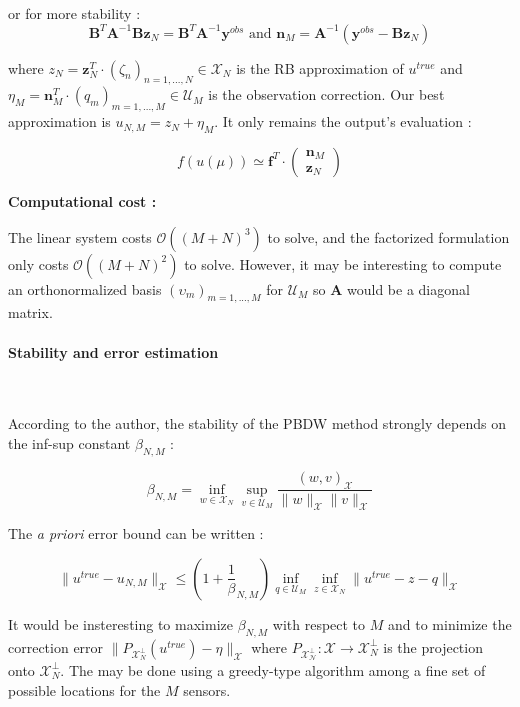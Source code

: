 \documentclass{article}
\begin{document}
or for more stability : $$\mathbf B^T\mathbf A^{-1}\mathbf B\mathbf z_N=\mathbf B^T\mathbf A^{-1}\mathbf y^{obs}\text{ and }\mathbf n_M=\mathbf A^{-1}(\mathbf y^{obs}-\mathbf B\mathbf z_N)$$


where $z_N=\mathbf z_N^T\cdot (\zeta_n)_{n=1,...,N}\in\mathcal X_N$ is the RB approximation of $u^{true}$ and $\eta_M=\mathbf n_M^T\cdot(q_m)_{m=1,...,M}\in\mathcal U_M$ is the observation correction. Our best approximation is  $u_{N,M}=z_N+\eta_M$. It only remains the output's evaluation :

$$f(u(\mu))\simeq\mathbf f^T\cdot\left(\begin{matrix}\mathbf n_M\\\mathbf z_N\end{matrix}\right)$$



\textbf{Computational cost :}

The linear system costs $\mathcal O((M+N)^3)$ to solve, and the factorized formulation only costs $\mathcal O((M+N)^2)$ to solve. However, it may be interesting to compute an orthonormalized basis $(\upsilon_m)_{m=1,...,M}$ for $\mathcal U_M$ so $\mathbf A$ would be a diagonal matrix.





\paragraph{Stability and error estimation}~


According to the author, the stability of the PBDW method strongly depends on the inf-sup constant $\beta_{N,M}$ :

$$\beta_{N,M} = \inf_{w\in\mathcal X_N}\sup_{v\in\mathcal U_M}\frac{(w,v)_\mathcal X}{\|w\|_\mathcal X\|v\|_\mathcal X}$$

The \emph{a priori} error bound can be written :

$$\|u^{true}-u_{N,M}\|_\mathcal X\leq\left(1+\frac1\beta_{N,M}\right)\inf_{q\in\mathcal U_M}\inf_{z\in\mathcal X_N}\|u^{true}-z-q\|_{\mathcal X}$$

It would be insteresting to maximize $\beta_{N,M}$ with respect to $M$ and to minimize the correction error $\|P_{\mathcal X_N^\perp}(u^{true})-\eta\|_\mathcal X$ where $P_\mathcal{X_N^\perp}:\mathcal X\to\mathcal X_N^\perp$ is the projection onto $\mathcal X_N^\perp$. The may be done using a greedy-type algorithm among a fine set of possible locations for the $M$ sensors.
\end{document}
